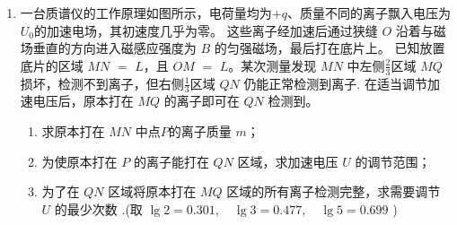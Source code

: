 \begin{enumerate}[leftmargin=0em]
{\begin{enumerate}
\end{enumerate}
}




\newpage
\item
{}
一台质谱仪的工作原理如图所示，电荷量均为$ +q $、质量不同的离子飘入电压为 $ U_{0} $的加速电场，其初速度几乎为零。 这些离子经加速后通过狭缝 $ O $ 沿着与磁场垂直的方向进入磁感应强度为 $ B $ 的匀强磁场，最后打在底片上。 已知放置底片的区域 $ MN $ $ = $ $ L $，且 $ OM $ $ = $ $ L $。某次测量发现 $ MN $ 中左侧$ \frac{ 2 }{ 3 } $区域 $ MQ $ 损坏，检测不到离子，但右侧$ \frac{ 1 }{ 3 } $区域 $ QN $ 仍能正常检测到离子. 在适当调节加速电压后，原本打在 $ MQ $ 的离子即可在 $ QN $ 检测到。
\begin{enumerate}
\renewcommand{\labelenumii}{(\arabic{enumii})}

\item 
求原本打在 $ MN $ 中点$ P $的离子质量 $ m $；

\item 
为使原本打在 $ P $ 的离子能打在 $ QN $ 区域，求加速电压 $ U $ 的调节范围；

\item 
为了在 $ QN $ 区域将原本打在 $ MQ $ 区域的所有离子检测完整，求需要调节 $ U $ 的最少次数 $. $(取 $\lg 2 = 0.301 , \quad \lg 3 = 0.477 , \quad \lg 5 = 0.699$ )

\end{enumerate}
\begin{figure}[h!]
\flushright

\end{figure}




\end{enumerate}

